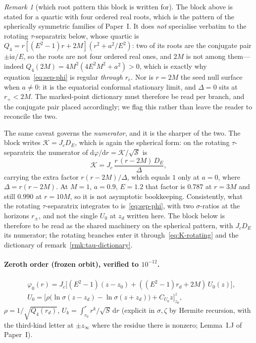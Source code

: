 \documentclass[12pt]{iopart}
\theoremstyle{plain}
\theoremstyle{definition}
\theoremstyle{remark}
\newtheorem{remark}[proposition]{Remark}
\newcommand{\rp}{r_{+}}
\newcommand{\re}{r_{e}}
\newcommand{\Jc}{J_{c}}
\newcommand{\dd}{\mathrm{d}}
\begin{document}
\begin{remark}[which root pattern this block is written for]
\label{rmk:rootpattern}
The block above is stated for a quartic with four ordered real roots, which is
the pattern of the spherically symmetric families of Paper~I. It does
\emph{not} specialise verbatim to the rotating $\tau$-separatrix below, whose
quartic is $Q_4=r[(E^2-1)r+2M](r^2+a^2/E^2)$: two of its roots are the conjugate
pair $\pm\mathrm ia/E$, so the roots are not four ordered real ones, and $2M$ is
not among them---indeed $Q_4(2M)=4M^2(4E^2M^2+a^2)>0$, which is exactly why
equation~\eqref{eq:sep-phi} is regular \emph{through} $\re$. Nor is $r=2M$ the
seed null surface when $a\neq0$: it is the equatorial conformal stationary limit,
and $\Delta=0$ sits at $\rp<2M$. The marked-point dictionary must therefore be
read per branch, and the conjugate pair placed accordingly; we flag this rather
than leave the reader to reconcile the two.

The same caveat governs the \emph{numerator}, and it is the sharper of the two.
The block writes $\mathcal K=\Jc D_E$, which is again the spherical form: on the
rotating $\tau$-separatrix the numerator of $\dd\varphi/\dd r=\mathcal
K/\sqrt{\mathcal S}$ is
\begin{equation}
    \mathcal K=\Jc\,\frac{r\,(r-2M)\,D_E}{\Delta},
    \label{eq:K-rotating}
\end{equation}
carrying the extra factor $r(r-2M)/\Delta$, which equals $1$ only at $a=0$, where
$\Delta=r(r-2M)$. At $M=1$, $a=0.9$, $E=1.2$ that factor is $0.787$ at $r=3M$ and
still $0.990$ at $r=10M$, so it is not asymptotic bookkeeping. Consistently, what
the rotating $\tau$-separatrix integrates to is~\eqref{eq:sep-phi}, with two
$\sigma$-ratios at the horizons $r_\pm$, and not the single $U_0$ at $z_d$ written
here. The block below is therefore to be read as the shared machinery on the
spherical pattern, with $\Jc D_E$ its numerator; the rotating branches enter it
through~\eqref{eq:K-rotating} and the dictionary of
remark~\ref{rmk:tau-dictionary}.
\end{remark}

\paragraph{Zeroth order (frozen orbit), verified to $10^{-12}$.}
\begin{equation}
\begin{aligned}
&\varphi_0(r)=\Jc\big[(E^2-1)(z-z_0)+((E^2-1)r_d+2M)\,U_0(z)\big],\\
&U_0=\big[\rho\big(\ln\sigma(z{-}z_d)-\ln\sigma(z{+}z_d)\big)+C_{U_0}z\big]_{z_0}^{z},
\end{aligned}
\end{equation}
$\rho=1/\sqrt{Q_4(r_d)}$, $U_k=\int_{r_0}^r r^k/\sqrt S\,\dd r$ (explicit in
$\sigma,\zeta$ by Hermite recursion, with the third-kind letter at $\pm z_\infty$ where the
residue there is nonzero; Lemma~I.J of Paper~I).
\end{document}
